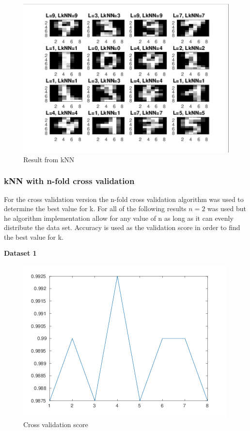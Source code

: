 \documentclass[a4paper,12pt]{article}
\begin{document}
\begin{figure}[H]
\centering
\caption{Result from kNN}\label{fig:kNN-result}
  \begin{minipage}[]{1\textwidth}
  \includegraphics[width=\textwidth]{figures/kNN_simple.png}
  \end{minipage}
\end{figure}

\subsubsection{kNN with n-fold cross validation}

For the cross validation version the n-fold cross validation algorithm was used to determine the best value for k. For all of the following results $n = 2$ was used but he algorithm implementation allow for any value of n as long as it can evenly distribute the data set. Accuracy is used as the validation score in order to find the best value for k.


\noindent \textbf{Dataset 1}

\begin{figure}[H]
\centering
\caption{Cross validation score}\label{fig:kNN-1-cv-score}
  \begin{minipage}[]{1\textwidth}
  \includegraphics[width=\textwidth]{figures/kNN_1_cv_score.png}
  \end{minipage}
\end{figure}
\end{document}
